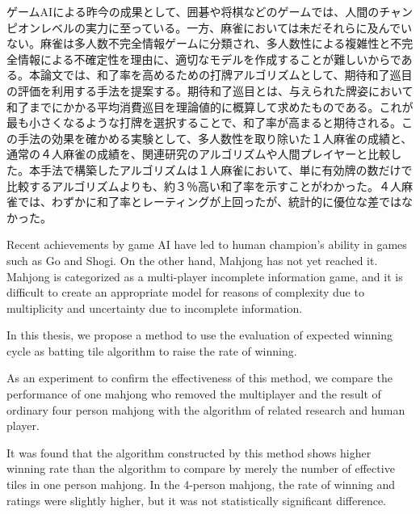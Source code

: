 
\begin{jabstract}

ゲームAIによる昨今の成果として、囲碁や将棋などのゲームでは、人間のチャンピオンレベルの実力に至っている。一方、麻雀においては未だそれらに及んでいない。麻雀は多人数不完全情報ゲームに分類され、多人数性による複雑性と不完全情報による不確定性を理由に、適切なモデルを作成することが難しいからである。本論文では、和了率を高めるための打牌アルゴリズムとして、期待和了巡目の評価を利用する手法を提案する。期待和了巡目とは、与えられた牌姿において和了までにかかる平均消費巡目を理論値的に概算して求めたものである。これが最も小さくなるような打牌を選択することで、和了率が高まると期待される。この手法の効果を確かめる実験として、多人数性を取り除いた１人麻雀の成績と、通常の４人麻雀の成績を、関連研究のアルゴリズムや人間プレイヤーと比較した。本手法で構築したアルゴリズムは１人麻雀において、単に有効牌の数だけで比較するアルゴリズムよりも、約３％高い和了率を示すことがわかった。４人麻雀では、わずかに和了率とレーティングが上回ったが、統計的に優位な差ではなかった。


\end{jabstract}


\begin{eabstract}

Recent achievements by game AI have led to human champion's ability in games such as Go and Shogi. On the other hand, Mahjong has not yet reached it. Mahjong is categorized as a multi-player incomplete information game, and it is difficult to create an appropriate model for reasons of complexity due to multiplicity and uncertainty due to incomplete information.

In this thesis, we propose a method to use the evaluation of expected winning cycle as batting tile algorithm to raise the rate of winning.

As an experiment to confirm the effectiveness of this method, we compare the performance of one mahjong who removed the multiplayer and the result of ordinary four person mahjong with the algorithm of related research and human player.

It was found that the algorithm constructed by this method shows higher winning rate than the algorithm to compare by merely the number of effective tiles in one person mahjong. In the 4-person mahjong, the rate of winning and ratings were slightly higher, but it was not statistically significant difference.

\end{eabstract}
